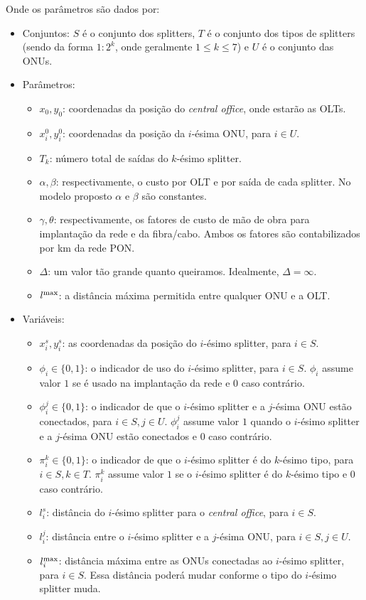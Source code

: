 \documentclass[12pt]{article}
\begin{document}
Onde os parâmetros são dados por:
\begin{itemize}
\item Conjuntos: $S$ é o conjunto dos splitters, $T$ é o conjunto dos tipos de splitters (sendo da forma $1:2^k$, onde geralmente $1\le k\le 7$) e $U$ é o conjunto das ONUs.
\item Parâmetros:
\begin{itemize}
\item $x_0, y_0$: coordenadas da posição do \textit{central office}, onde estarão as OLTs.
\item $x_i^0, y_i^0$: coordenadas da posição da $i$-ésima ONU, para $i\in U$.
\item $T_k$: número total de saídas do $k$-ésimo splitter.
\item $\alpha, \beta$: respectivamente, o custo por OLT e por saída de cada splitter. No modelo proposto $\alpha$ e $\beta$ são constantes.
\item $\gamma, \theta$: respectivamente, os fatores de custo de mão de obra para implantação da rede e da fibra/cabo. Ambos os fatores são contabilizados por km da rede PON.
\item $\Delta$: um valor tão grande quanto queiramos. Idealmente, $\Delta = \infty$.
\item $l^{{\rm max}}$: a distância máxima permitida entre qualquer ONU e a OLT.
\end{itemize}
\item Variáveis:
\begin{itemize}
  \item $x_i^s,y_i^s$: as coordenadas da posição do $i$-ésimo splitter, para $i\in S$.
  \item $\phi_i \in \{0,1\}$: o indicador de uso do $i$-ésimo splitter, para $i\in S$. $\phi_i$ assume valor $1$ se é usado na implantação da rede e $0$ caso contrário.
  \item $\phi_i^j \in \{0,1\}$: o indicador de que o $i$-ésimo splitter e a $j$-ésima ONU estão conectados, para $i\in S, j\in U$. $\phi_i^j$ assume valor $1$ quando o $i$-ésimo splitter e a $j$-ésima ONU estão conectados e $0$ caso contrário.
  \item $\pi_i^k \in \{0,1\}$: o indicador de que o $i$-ésimo splitter é do $k$-ésimo tipo, para $i\in S,k\in T$. $\pi_i^k$ assume valor $1$ se o $i$-ésimo splitter é do $k$-ésimo tipo e $0$ caso contrário.
  \item $l_i^s$: distância do $i$-ésimo splitter para o \textit{central office}, para $i \in S$.
  \item $l_i^j$: distância entre o $i$-ésimo splitter e a $j$-ésima ONU, para $i \in S, j \in U$.
  \item $l_i^{{\rm max}}$: distância máxima entre as ONUs conectadas ao $i$-ésimo splitter, para $i\in S$. Essa distância poderá mudar conforme o tipo do $i$-ésimo splitter muda.
\end{itemize}
\end{itemize}
\end{document}
